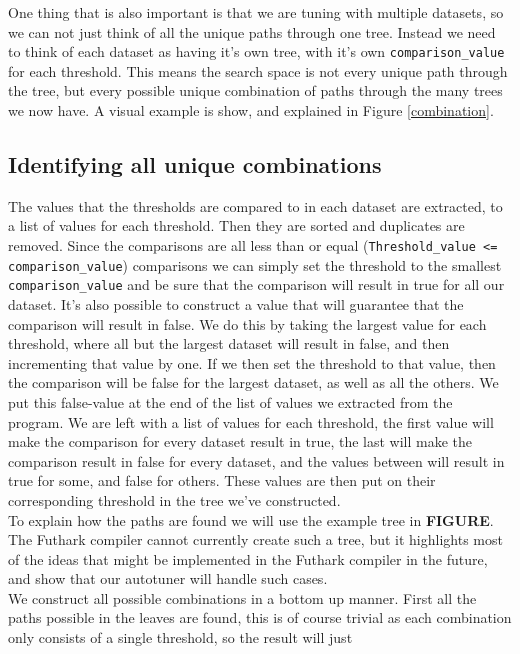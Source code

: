 One thing that is also important is that we are tuning with multiple datasets,
so we can not just think of all the unique paths through one tree. Instead we
need to think of each dataset as having it's own tree, with it's own 
\texttt{comparison\_value} for each threshold. This means the search space is
not every unique path through the tree, but every possible unique combination
of paths through the many trees we now have. A visual example is show, and explained in Figure \ref{combination}. 


\subsection{Identifying all unique combinations}
The values that the thresholds are compared to in each dataset are extracted,
to a list of values for each threshold. Then they are sorted and duplicates are
removed. Since the comparisons are all less than or equal
(\texttt{Threshold\_value <= comparison\_value}) comparisons we can simply
set the threshold to the smallest \texttt{comparison\_value} and be sure that the comparison
will result in true for all our dataset. It's also possible to construct a
value that will guarantee that the comparison will result in false. We do this
by taking the largest value for each threshold, where all but the largest
dataset will result in false, and then incrementing that value by one. If we then set the threshold to that value, then the comparison will be false for the largest dataset, as well as all the others. We put this false-value at
the end of the list of values we extracted from the program. We are left with a
list of values for each threshold, the first value will make the comparison for
every dataset result in true, the last will make the comparison result in false
for every dataset, and the values between will result in true for some, and
false for others. These values are then put on their corresponding threshold in
the tree we've constructed.
\\
To explain how the paths are found we will use the example tree in
\textbf{FIGURE}. The Futhark compiler cannot currently create such a tree, but
it highlights most of the ideas that might be implemented in the Futhark
compiler in the future, and show that our autotuner will handle such cases. \\
We construct all possible combinations in a bottom up manner. First
all the paths possible in the leaves are found, this is of course trivial as
each combination only consists of a single threshold, so the result will just
